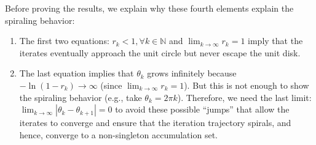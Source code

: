 \documentclass{article}
\theoremstyle{plain}
\theoremstyle{definition}
\theoremstyle{remark}
\newcommand*{\NN}{\mathbb{N}}
\begin{document}
Before proving the results, we explain why these fourth elements explain the spiraling behavior: 
\begin{enumerate}[leftmargin=*]
    \item The first two equations: $r_k < 1, \forall k \in \NN$ and $\lim_{k \to \infty} r_k = 1$ imply that the iterates eventually approach the unit circle but never escape the unit disk.
    \item The last equation implies that $\theta_k$ grows infinitely because $- \ln(1 - r_k) \to \infty$ (since $\lim_{k \to \infty} r_k = 1$). But this is not enough to show the spiraling behavior (e.g., take $\theta_k = 2\pi k$). Therefore, we need the last limit: $\lim_{k \to \infty} |\theta_k - \theta_{k + 1}| = 0$ to avoid these possible ``jumps'' that allow the iterates to converge and ensure that the iteration trajectory spirals, and hence, converge to a non-singleton accumulation set.  
\end{enumerate}
\end{document}
